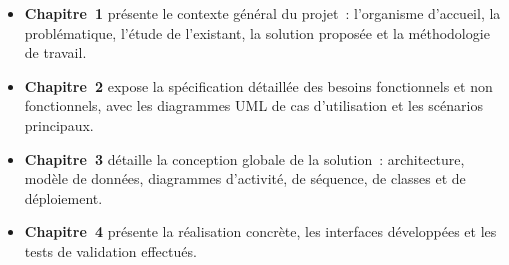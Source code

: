 \begin{itemize}
  \item \textbf{Chapitre~1} présente le contexte général du projet~: l'organisme
        d'accueil, la problématique, l'étude de l'existant, la solution proposée et la
        méthodologie de travail.
  \item \textbf{Chapitre~2} expose la spécification détaillée des besoins fonctionnels
        et non fonctionnels, avec les diagrammes \ac{UML} de cas d'utilisation et les
        scénarios principaux.
  \item \textbf{Chapitre~3} détaille la conception globale de la solution~: architecture,
        modèle de données, diagrammes d'activité, de séquence, de classes et de
        déploiement.
  \item \textbf{Chapitre~4} présente la réalisation concrète, les interfaces développées
        et les tests de validation effectués.
\end{itemize}
